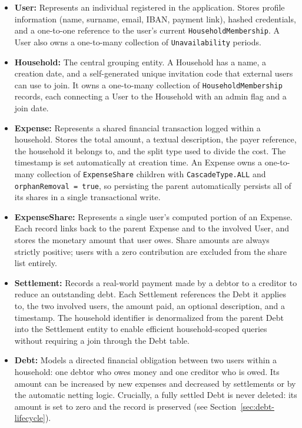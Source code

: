 \begin{itemize}
    \item \textbf{User:} Represents an individual registered in the application. Stores profile information (name, surname, email, IBAN, payment link), hashed credentials, and a one-to-one reference to the user's current \texttt{HouseholdMembership}. A User also owns a one-to-many collection of \texttt{Unavailability} periods.
    \item \textbf{Household:} The central grouping entity. A Household has a name, a creation date, and a self-generated unique invitation code that external users can use to join. It owns a one-to-many collection of \texttt{HouseholdMembership} records, each connecting a User to the Household with an admin flag and a join date.
    \item \textbf{Expense:} Represents a shared financial transaction logged within a household. Stores the total amount, a textual description, the payer reference, the household it belongs to, and the split type used to divide the cost. The timestamp is set automatically at creation time. An Expense owns a one-to-many collection of \texttt{ExpenseShare} children with \texttt{CascadeType.ALL} and \texttt{orphanRemoval = true}, so persisting the parent automatically persists all of its shares in a single transactional write.
    \item \textbf{ExpenseShare:} Represents a single user's computed portion of an Expense. Each record links back to the parent Expense and to the involved User, and stores the monetary amount that user owes. Share amounts are always strictly positive; users with a zero contribution are excluded from the share list entirely.
    \item \textbf{Settlement:} Records a real-world payment made by a debtor to a creditor to reduce an outstanding debt. Each Settlement references the Debt it applies to, the two involved users, the amount paid, an optional description, and a timestamp. The household identifier is denormalized from the parent Debt into the Settlement entity to enable efficient household-scoped queries without requiring a join through the Debt table.
    \item \textbf{Debt:} Models a directed financial obligation between two users within a household: one debtor who owes money and one creditor who is owed. Its amount can be increased by new expenses and decreased by settlements or by the automatic netting logic. Crucially, a fully settled Debt is never deleted: its amount is set to zero and the record is preserved (see Section~\ref{sec:debt-lifecycle}).

\end{itemize}

